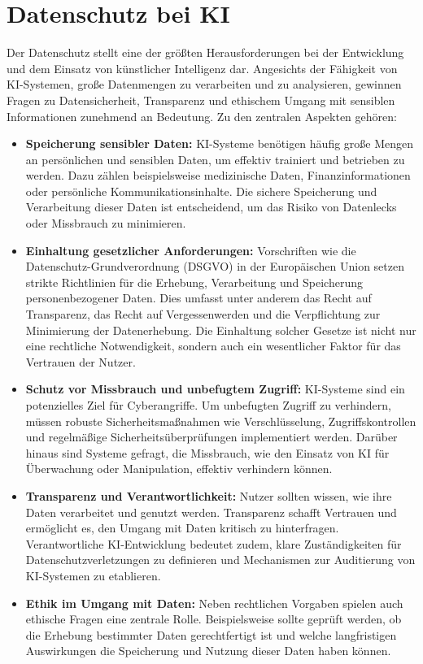 \documentclass[a4paper,12pt]{article}
\begin{document}
\section{Datenschutz bei KI}

Der Datenschutz stellt eine der größten Herausforderungen bei der Entwicklung und dem Einsatz von künstlicher Intelligenz dar. Angesichts der Fähigkeit von KI-Systemen, große Datenmengen zu verarbeiten und zu analysieren, gewinnen Fragen zu Datensicherheit, Transparenz und ethischem Umgang mit sensiblen Informationen zunehmend an Bedeutung. Zu den zentralen Aspekten gehören:

\begin{itemize} \item \textbf{Speicherung sensibler Daten:}
KI-Systeme benötigen häufig große Mengen an persönlichen und sensiblen Daten, um effektiv trainiert und betrieben zu werden. Dazu zählen beispielsweise medizinische Daten, Finanzinformationen oder persönliche Kommunikationsinhalte. Die sichere Speicherung und Verarbeitung dieser Daten ist entscheidend, um das Risiko von Datenlecks oder Missbrauch zu minimieren.

\item \textbf{Einhaltung gesetzlicher Anforderungen:}  
Vorschriften wie die Datenschutz-Grundverordnung (DSGVO) in der Europäischen Union setzen strikte Richtlinien für die Erhebung, Verarbeitung und Speicherung personenbezogener Daten. Dies umfasst unter anderem das Recht auf Transparenz, das Recht auf Vergessenwerden und die Verpflichtung zur Minimierung der Datenerhebung. Die Einhaltung solcher Gesetze ist nicht nur eine rechtliche Notwendigkeit, sondern auch ein wesentlicher Faktor für das Vertrauen der Nutzer.

\item \textbf{Schutz vor Missbrauch und unbefugtem Zugriff:}  
KI-Systeme sind ein potenzielles Ziel für Cyberangriffe. Um unbefugten Zugriff zu verhindern, müssen robuste Sicherheitsmaßnahmen wie Verschlüsselung, Zugriffskontrollen und regelmäßige Sicherheitsüberprüfungen implementiert werden. Darüber hinaus sind Systeme gefragt, die Missbrauch, wie den Einsatz von KI für Überwachung oder Manipulation, effektiv verhindern können.

\item \textbf{Transparenz und Verantwortlichkeit:}  
Nutzer sollten wissen, wie ihre Daten verarbeitet und genutzt werden. Transparenz schafft Vertrauen und ermöglicht es, den Umgang mit Daten kritisch zu hinterfragen. Verantwortliche KI-Entwicklung bedeutet zudem, klare Zuständigkeiten für Datenschutzverletzungen zu definieren und Mechanismen zur Auditierung von KI-Systemen zu etablieren.

\item \textbf{Ethik im Umgang mit Daten:}  
Neben rechtlichen Vorgaben spielen auch ethische Fragen eine zentrale Rolle. Beispielsweise sollte geprüft werden, ob die Erhebung bestimmter Daten gerechtfertigt ist und welche langfristigen Auswirkungen die Speicherung und Nutzung dieser Daten haben können.
\end{itemize}
\end{document}
